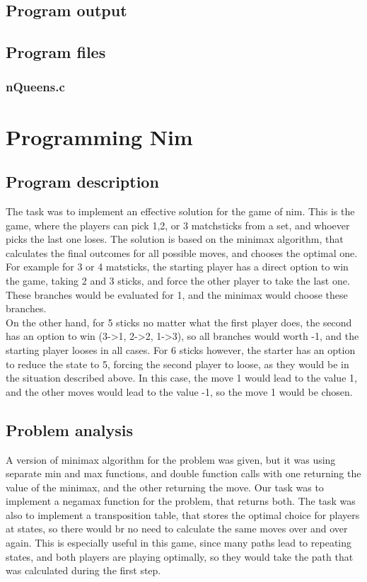 \documentclass{article}
\begin{document}
\subsection*{Program output}


\subsection*{Program files}
\subsubsection*{nQueens.c}


\section*{Programming Nim} 
\subsection*{Program description}
The task was to implement an effective solution for the game of nim. This is the game, where the players can pick 1,2, or 3 matchsticks from a set, and whoever picks the last one loses. The solution is based on the minimax algorithm, that calculates the final outcomes for all possible moves, and chooses the optimal one.\\
For example for 3 or 4 matsticks, the starting player has a direct option to win the game, taking 2 and 3 sticks, and force the other player to take the last one. These branches would be evaluated for 1, and the minimax would choose these branches.\\
On the other hand, for 5 sticks no matter what the first player does, the second has an option to win (3->1, 2->2, 1->3), so all branches would worth -1, and the starting player looses in all cases. For 6 sticks however, the starter has an option to reduce the state to 5, forcing the second player to loose, as they would be in the situation described above. In this case, the move 1 would lead to the value 1, and the other moves would lead to the value -1, so the move 1 would be chosen.
\subsection*{Problem analysis}
A version of minimax algorithm for the problem was given, but it was using separate min and max functions, and double function calls with one returning the value of the minimax, and the other returning the move. Our task was to implement a negamax function for the problem, that returns both. The task was also to implement a transposition table, that stores the optimal choice for players at states, so there would br no need to calculate the same moves over and over again. This is especially useful in this game, since many paths lead to repeating states, and both players are playing optimally, so they would take the path that was calculated during the first step.
\end{document}
